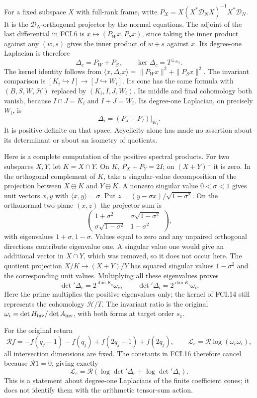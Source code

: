 For a fixed subspace $X$ with full-rank frame, write
$P_X=X(X^*\mathcal D_NX)^{-1}X^*\mathcal D_N$.
It is the $\mathcal D_N$-orthogonal projector by the normal equations.
The adjoint of the last differential in FCI.6 is
$x\mapsto(P_Wx,P_Sx)$, since taking the inner product against any
$(w,s)$ gives the inner product of $w+s$ against $x$.
Its degree-one Laplacian is therefore
\[
 \Delta_c=P_W+P_S,\qquad \ker\Delta_c=T^{\perp_{\mathcal D_N}}.
 \tag{FCI.14}
\]
The kernel identity follows from
$\langle x,\Delta_cx\rangle=\|P_Wx\|^2+\|P_Sx\|^2$.
The invariant comparison is
$[K_i\hookrightarrow I]\to[J\hookrightarrow W_i]$.
Its cone has the same formula with $(B,S,W,\mathcal H)$ replaced
by $(K_i,I,J,W_i)$.  Its middle and final cohomology both vanish,
because $I\cap J=K_i$ and $I+J=W_i$.  Its degree-one Laplacian,
on precisely $W_i$, is
\[
 \Delta_i=(P_J+P_I)|_{W_i}.
 \tag{FCI.15}
\]
It is positive definite on that space.  Acyclicity alone has made
no assertion about its determinant or about an isometry of quotients.

Here is a complete computation of the positive spectral products.
For two subspaces $X,Y$, let $K=X\cap Y$.  On $K$, $P_X+P_Y=2I$;
on $(X+Y)^\perp$ it is zero.  In the orthogonal complement of $K$,
take a singular-value decomposition of the projection between
$X\ominus K$ and $Y\ominus K$.  A nonzero singular value
$0<\sigma<1$ gives unit vectors $x,y$ with $\langle x,y\rangle=\sigma$.
Put $z=(y-\sigma x)/\sqrt{1-\sigma^2}$.  On the orthonormal
two-plane $(x,z)$ the projector sum is
\[
 \begin{pmatrix}1+\sigma^2&\sigma\sqrt{1-\sigma^2}\\
 \sigma\sqrt{1-\sigma^2}&1-\sigma^2\end{pmatrix},
\]
with eigenvalues $1+\sigma,1-\sigma$.  Values equal to zero
and any unpaired orthogonal directions contribute eigenvalue one.
A singular value one would give an additional vector in $X\cap Y$,
which was removed, so it does not occur here.  The quotient projection
$X/K\to(X+Y)/Y$ has squared singular values $1-\sigma^2$ and
the corresponding unit values.  Multiplying all these eigenvalues proves
\[
 \det{}'\Delta_c=2^{\dim K_c}\omega_c,\qquad
 \det{}'\Delta_i=2^{\dim K_i}\omega_i.
 \tag{FCI.16}
\]
Here the prime multiplies the positive eigenvalues only; the kernel
of FCI.14 still represents the cohomology $\mathcal H/T$.
The invariant ratio is the original $\omega_i=\det H_{\rm inv}/
\det A_{\rm inv}$, with both forms at target order $s_1$.

For the original return
\[
 \mathcal Rf=-f(q_j-1)-f(q_j)+f(2q_j-1)+f(2q_j),\qquad
 \mathcal L_e=\mathcal R\log(\omega_c\omega_i),
 \tag{FCI.17}
\]
all intersection dimensions are fixed.  The constants in FCI.16
therefore cancel because $\mathcal R1=0$, giving exactly
\[
 \mathcal L_e=\mathcal R\left(\log\det{}'\Delta_c+
                                      \log\det{}'\Delta_i\right).
 \tag{FCI.18}
\]
This is a statement about degree-one Laplacians of the finite coefficient
cones; it does not identify them with the arithmetic tensor-sum action.

